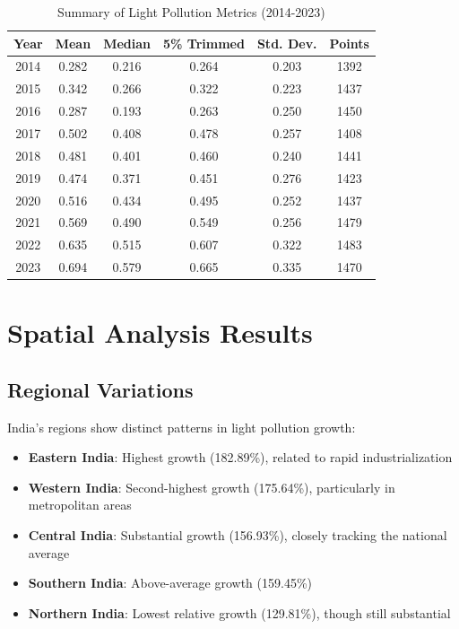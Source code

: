 \documentclass[12pt,a4paper]{article}
\begin{document}
\begin{table}[h]
\centering
\caption{Summary of Light Pollution Metrics (2014-2023)}
\begin{tabular}{@{}cccccc@{}}
\toprule
\textbf{Year} & \textbf{Mean} & \textbf{Median} & \textbf{5\% Trimmed} & \textbf{Std. Dev.} & \textbf{Points} \\ \midrule
2014 & 0.282 & 0.216 & 0.264 & 0.203 & 1392 \\
2015 & 0.342 & 0.266 & 0.322 & 0.223 & 1437 \\
2016 & 0.287 & 0.193 & 0.263 & 0.250 & 1450 \\
2017 & 0.502 & 0.408 & 0.478 & 0.257 & 1408 \\
2018 & 0.481 & 0.401 & 0.460 & 0.240 & 1441 \\
2019 & 0.474 & 0.371 & 0.451 & 0.276 & 1423 \\
2020 & 0.516 & 0.434 & 0.495 & 0.252 & 1437 \\
2021 & 0.569 & 0.490 & 0.549 & 0.256 & 1479 \\
2022 & 0.635 & 0.515 & 0.607 & 0.322 & 1483 \\
2023 & 0.694 & 0.579 & 0.665 & 0.335 & 1470 \\ \bottomrule
\end{tabular}
\end{table}

\section{Spatial Analysis Results}

\subsection{Regional Variations}
India's regions show distinct patterns in light pollution growth:

\begin{itemize}
    \item \textbf{Eastern India}: Highest growth (182.89\%), related to rapid industrialization
    \item \textbf{Western India}: Second-highest growth (175.64\%), particularly in metropolitan areas
    \item \textbf{Central India}: Substantial growth (156.93\%), closely tracking the national average
    \item \textbf{Southern India}: Above-average growth (159.45\%)
    \item \textbf{Northern India}: Lowest relative growth (129.81\%), though still substantial
\end{itemize}
\end{document}
